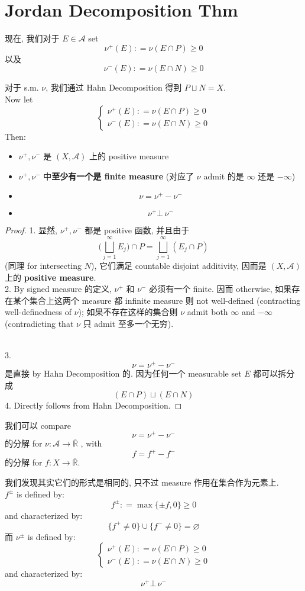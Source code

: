 \documentclass[lang=cn,11pt]{elegantbook}
\begin{document}
\section{Jordan Decomposition Thm}
现在, 我们对于 $E \in \mathcal{A}$ set \[
\nu^+ (E)  : = \nu(E \cap P) \geq 0
\]
以及 \[
\nu^- (E) : = \nu(E \cap N) \geq 0
\]
\begin{lemma}
对于 s.m. $\nu$, 我们通过 Hahn Decomposition 得到 $P \sqcup N = X$.\\
Now let $$\begin{cases}
    \nu^+ (E)  : = \nu(E \cap P) \geq 0 \\
    \nu^- (E) : = \nu(E \cap N) \geq 0
\end{cases}$$
Then:
    \begin{itemize}
        \item $\nu^+,\nu^-$ 是 $(X,\mathcal{A})$ 上的 positive measure
        \item $\nu^+,\nu^-$ 中\textbf{至少有一个是 finite measure} (对应了 $\nu$ admit 的是 $\infty$ 还是 $-\infty$)
        \item \[\nu = \nu^+ - \nu^-\]
        \item \[ \nu^+ \bot \,\nu^- \]
    \end{itemize}
\end{lemma}
\begin{proof}
1. 显然, $\nu^+,\nu^-$ 都是 positive 函数, 并且由于 \[
\bigg(\bigsqcup_{j=1}^\infty E_j \bigg)\cap P  =  \bigsqcup_{j=1}^\infty (E_j \cap P)
\]
(同理 for intersecting $N$), 它们满足 countable disjoint additivity, 因而是 $(X,\mathcal{A})$ 上的 \textbf{positive measure}.\\
2. By signed measure 的定义, $\nu^+$ 和 $\nu^-$ 必须有一个 finite. 因而 otherwise, 如果存在某个集合上这两个 measure 都 infinite measure 则 not well-defined (contracting well-definedness of $\nu$); 如果不存在这样的集合则 $\nu$ admit both $\infty$ and $-\infty$ (contradicting that $\nu$ 只 admit 至多一个无穷).\\\

3. \[\nu = \nu^+ - \nu^-\] 是直接 by Hahn Decomposition 的. 因为任何一个 measurable set $E$ 都可以拆分成 \[
(E \cap P) \sqcup (E\cap N)
\]
4. Directly follows from Hahn Decomposition.
\end{proof}

\begin{remark}
    我们可以 compare \[
    \nu = \nu^+ - \nu^-
    \] 的分解 for $\nu: \mathcal{A} \to \overline{\mathbb{R}}$ , with \[
    f = f^+ - f^-
    \] 的分解 for $f: X \to \overline{\mathbb{R}}$.

我们发现其实它们的形式是相同的, 只不过 measure 作用在集合作为元素上.\\

$f^{\pm}$ is defined by: \[
f^{\pm } : = \max \{ \pm f , 0\}\geq 0
\]and characterized by: \[
\{ f^+ \not = 0\} \cup \{ f^- \not = 0 \} = \varnothing
 \]
 而 $\nu^{\pm}$ is defined by:$$\begin{cases}
    \nu^+ (E)  : = \nu(E \cap P) \geq 0 \\
    \nu^- (E) : = \nu(E \cap N) \geq 0
\end{cases}$$
and characterized by: \[ \nu^+ \bot \,\nu^- \]
\end{remark}
\end{document}
